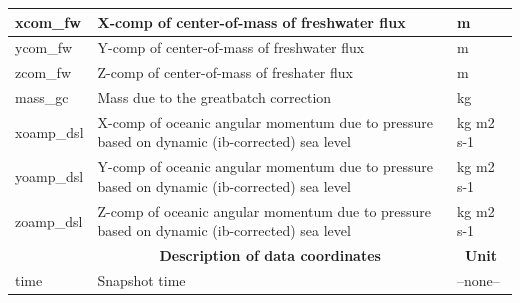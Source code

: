 \begin{longtable}{|m{}|m{}|m{}|}
xcom\_fw &X-comp of center-of-mass of freshwater flux &m  \\ \hline
ycom\_fw &Y-comp of center-of-mass of freshwater flux &m  \\ \hline
zcom\_fw &Z-comp of center-of-mass of freshater flux &m  \\ \hline
mass\_gc &Mass due to the greatbatch correction &kg  \\ \hline
xoamp\_dsl &X-comp of oceanic angular momentum due to pressure based on dynamic (ib-corrected) sea level &kg m2 s-1  \\ \hline
yoamp\_dsl &Y-comp of oceanic angular momentum due to pressure based on dynamic (ib-corrected) sea level &kg m2 s-1  \\ \hline
zoamp\_dsl &Z-comp of oceanic angular momentum due to pressure based on dynamic (ib-corrected) sea level &kg m2 s-1  \\ \hline
\rowcolor{lightgray} \multicolumn{1}{|c|}{\textbf{Coordinates}} & \multicolumn{1}{|c|}{\textbf{Description of data coordinates}} &  \multicolumn{1}{|c|}{\textbf{Unit}}\\ \hline
time &Snapshot time &--none--  \\ \hline
\end{longtable}

\newp
\pagebreak
